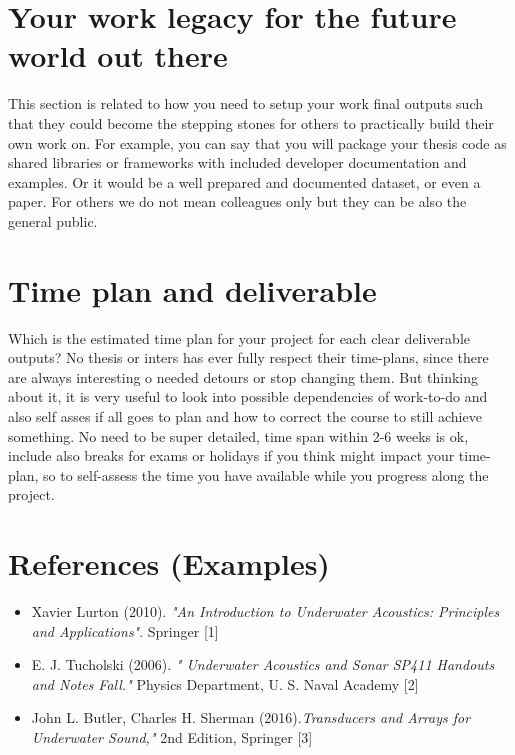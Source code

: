\documentclass{article}
\begin{document}
\section{Your work legacy for the future world out there}
This section is related to how you need to setup your work final outputs such that they could become the stepping stones for others to practically build their own work on. For example, you can say that you will package your thesis code as shared libraries or frameworks with included developer documentation and examples. Or it would be a well prepared and documented dataset, or even a paper. For others we do not mean colleagues only but they can be also the general public. 

\section{Time plan and deliverable}
 Which is the estimated time plan for your project for each clear deliverable outputs? No thesis or inters has ever fully respect their time-plans, since there are always interesting o needed detours or stop changing them. But thinking about it, it is very useful to look into possible dependencies of work-to-do and also self asses if all goes to plan and how to correct the course to still achieve something.  No need to be super detailed, time span within 2-6 weeks is ok, include also breaks for exams or holidays if you think might impact your time-plan, so to self-assess the time you have available while you progress along the project.

%

\section*{References (Examples)}

\begin{itemize}
    \item  Xavier Lurton (2010).  \textit{"An Introduction to Underwater Acoustics: Principles and Applications"}. Springer [1]

    \item  E.  J.  Tucholski (2006). \textit{" Underwater  Acoustics  and  Sonar  SP411  Handouts  and  Notes  Fall."} Physics  Department, U.  S.  Naval  Academy [2]
    \item John L. Butler, Charles H. Sherman (2016).\textit{Transducers and  Arrays  for Underwater Sound,"} 2nd Edition, Springer [3]
\end{itemize}
\end{document}
